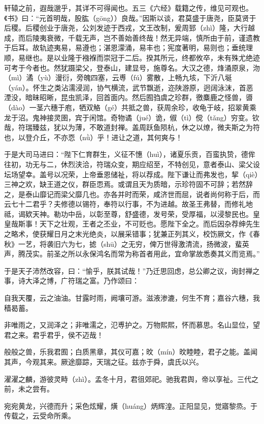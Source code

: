 \documentclass[UTF8,titlepage,oneside]{ctexbook}
\begin{document}
轩辕之前，遐哉邈乎，其详不可得闻也。五三《六经》载籍之传，维见可观也。《书》曰：“元首明哉，股肱（gōng））良哉。”因斯以谈，君莫盛于唐尧，臣莫贤于后稷。后稷创业于唐尧，公刘发迹于西戎，文王改制，爰周郅（zhì）隆，大行越成，而后陵夷衰微，千载无声，岂不善始善终哉！然无异端，慎所由于前，谨遗教于后耳。故轨迹夷易，易遵也；湛恩濛涌，易丰也；宪度著明，易则也；垂统理顺，易继也。是以业隆于襁褓而崇冠于二后。揆其所元，终都攸卒，未有殊尤绝迹可考于今者也。然犹蹑梁父，登泰山，建显号，施尊名。大汉之德，烽涌原泉，沕（mì）潏（yù）漫衍，旁魄四塞，云尃（fú）雾散，上畅九垓，下沂八埏（yán）。怀生之类沾濡浸润，协气横流，武节飘逝，迩陕游原，迥阔泳沫，首恶湮没，暗昧昭晰，昆虫凯泽，回首面内。然后囿驺虞之珍群，徼麋鹿之怪兽，噵（dào）一茎六穗于庖，牺双觡（gé）共抵之兽，获周余珍，收龟于岐，招翠黄乘龙于沼。鬼神接灵圉，宾于闲馆。奇物谲（jué）诡，俶（tì）傥（tǎng）穷变。钦哉，符瑞臻兹，犹以为薄，不敢道封禅。盖周跃鱼陨杭，休之以燎，微夫斯之为符也，以登介丘，不亦恧（nǜ）乎！进让之道，其何爽与！


于是大司马进曰：“陛下仁育群生，义征不憓（huì），诸夏乐贡，百蛮执贽，德侔往初，功无与二，休烈浃洽，符瑞众变，期应绍至，不特创见，意者泰山、梁父设坛场望幸。盖号以况荣，上帝垂恩储祉，将以荐成。陛下谦让而弗发也，挈（qiè）三神之欢，缺王道之仪，群臣恧焉。或谓且天为质暗，示珍符固不可辞；若然辞之，是泰山靡记而梁父靡几也。亦各并时而荣，咸济世而屈，说者尚何称于后，而云七十二君乎？夫修德以锡符，奉符以行事，不为进越。故圣王弗替，而修礼地祗，谒欵天神。勒功中岳，以彰至尊，舒盛德，发号荣，受厚福，以浸黎民也。皇皇哉斯事！天下之壮观，王者之丕业，不可贬也。愿陛下全之。而后因杂荐绅先生之略术，使获耀日月之末光绝炎，以展采错事；犹兼正列其义，校饬厥文，作《春秋》一艺，将袭旧六为七，摅（shū）之无穷，俾万世得激清流，扬微波，蜚英声，腾茂实。前圣之所以永保鸿名而常为称首者用此，宜命掌故悉奏其义而览焉。”


于是天子沛然改容，曰：“愉乎，朕其试哉！”乃迁思回虑，总公卿之议，询封禅之事，诗大泽之博，广符瑞之富。乃作颂曰：


自我天覆，云之油油。甘露时雨，阙壤可游。滋液渗漉，何生不育；嘉谷六穗，我穑曷蓄。


非唯雨之，又润泽之；非唯濡之，氾尃护之。万物熙熙，怀而慕思。名山显位，望君之来。君乎君乎，侯不迈哉！


般般之兽，乐我君囿；白质黑章，其仪可嘉；旼（mín）旼睦睦，君子之能。盖闻其声，今观其来。厥途靡踪，天瑞之征。兹亦于舜，虞氏以兴。


濯濯之麟，游彼灵畤（zhì）。孟冬十月，君徂郊祀。驰我君舆，帝以享祉。三代之前，未之尝有。


宛宛黄龙，兴德而升；采色炫耀，熿（huáng）炳辉湟。正阳显见，觉寤黎烝。于传载之，云受命所乘。
\end{document}
